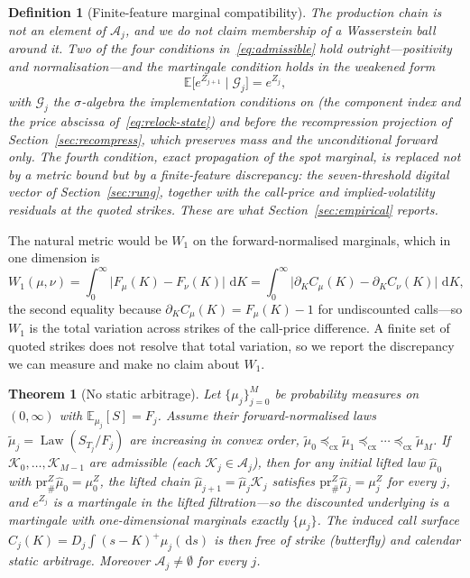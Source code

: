 \documentclass[11pt]{article}
\newtheorem{theorem}{Theorem}
\newtheorem{definition}{Definition}
\newcommand{\E}{\mathbb{E}}
\newcommand{\law}{\operatorname{Law}}
\newcommand{\cK}{\mathcal{K}}
\newcommand{\cA}{\mathcal{A}}
\newcommand{\cG}{\mathcal{G}}
\providecommand{\pr}{\mathrm{pr}}
\providecommand{\1}{\mathbf 1}
\newcommand{\cxle}{\preceq_{\mathrm{cx}}}
\newcommand{\dd}{\,\mathrm{d}}
\begin{document}
\begin{definition}[Finite-feature marginal compatibility]
\label{def:eps-admissible}
The production chain is not an element of $\cA_j$, and we do not claim membership of a Wasserstein
ball around it. Two of the four conditions in~\eqref{eq:admissible} hold outright---positivity and
normalisation---and the martingale condition holds in the weakened form
\begin{equation}
  \E\bigl[e^{Z_{j+1}}\mid\cG_j\bigr]=e^{Z_j},
\label{eq:eps-admissible}
\end{equation}
with $\cG_j$ the $\sigma$-algebra the implementation conditions on (the component index and the
price abscissa of~\eqref{eq:relock-state}) and \emph{before} the recompression projection of
Section~\ref{sec:recompress}, which preserves mass and the unconditional forward only. The fourth
condition, exact propagation of the spot marginal, is replaced not by a metric bound but by a
\emph{finite-feature discrepancy}: the seven-threshold digital vector of Section~\ref{sec:rung},
together with the call-price and implied-volatility residuals at the quoted strikes. These are what
Section~\ref{sec:empirical} reports.
\end{definition}

\noindent The natural metric would be $W_1$ on the forward-normalised marginals, which in one
dimension is
\begin{equation}
  W_1(\mu,\nu)=\int_0^{\infty}\bigl|F_\mu(K)-F_\nu(K)\bigr|\,\dd K
  =\int_0^{\infty}\bigl|\partial_K C_\mu(K)-\partial_K C_\nu(K)\bigr|\,\dd K,
  \label{eq:w1-digital}
\end{equation}
the second equality because $\partial_K C_\mu(K)=F_\mu(K)-1$ for undiscounted calls---so $W_1$ is
the total variation across strikes of the call-price difference. A finite set of quoted strikes does
not resolve that total variation, so we report the discrepancy we can measure and make no claim
about $W_1$.

\begin{theorem}[No static arbitrage]
\label{thm:noarb}
Let $\{\mu_j\}_{j=0}^M$ be probability measures on $(0,\infty)$ with
$\E_{\mu_j}[S]=F_j$. Assume their forward-normalised laws $\tilde\mu_j=\law(S_{T_j}/F_j)$ are
increasing in convex order, $\tilde\mu_0\cxle\tilde\mu_1\cxle\cdots\cxle\tilde\mu_M$.
If $\cK_0,\dots,\cK_{M-1}$ are admissible (each $\cK_j\in\cA_j$), then for any initial
\emph{lifted} law $\widehat\mu_0$ with $\pr^Z_{\#}\widehat\mu_0=\mu^Z_0$, the lifted chain
$\widehat\mu_{j+1}=\widehat\mu_j\cK_j$ satisfies $\pr^Z_{\#}\widehat\mu_j=\mu^Z_j$ for every $j$,
and $e^{Z_j}$ is a martingale in the lifted filtration---so the discounted underlying is a
martingale with one-dimensional marginals exactly $\{\mu_j\}$. The induced call surface
$C_j(K)=D_j\int(s-K)^+\mu_j(\dd s)$ is then free of strike (butterfly) and calendar static
arbitrage. Moreover $\cA_j\neq\emptyset$ for every $j$.
\end{theorem}
\end{document}
